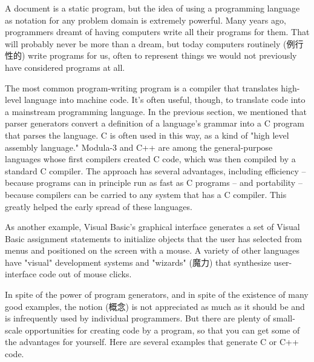 A document is a static program, but the idea of using a programming
language as notation for any problem domain is extremely powerful. Many
years ago, programmers dreamt of having computers write all their programs
for them. That will probably never be more than a dream, but today
computers routinely (例行性的) write programs for us, often to represent
things we would not previously have considered programs at all.

The most common program-writing program is a compiler that translates high-
level language into machine code. It's often useful, though, to translate
code into a mainstream programming language. In the previous section, we
mentioned that parser generators convert a definition of a language's
grammar into a C program that parses the language. C is often used in this
way, as a kind of "high level assembly language." Modula-3 and C++ are
among the general-purpose languages whose first compilers created C code,
which was then compiled by a standard C compiler.  The approach has several
advantages, including efficiency -- because programs can in principle run
as fast as C programs -- and portability -- because compilers can be
carried to any system that has a C compiler. This greatly helped the early
spread of these languages.

As another example, Visual Basic's graphical interface generates a set of
Visual Basic assignment statements to initialize objects that the user has
selected from menus and positioned on the screen with a mouse. A variety of
other languages have "visual" development systems and "wizards" (魔力) that
synthesize user-interface code out of mouse clicks.

In spite of the power of program generators, and in spite of the existence
of many good examples, the notion (概念) is not appreciated as much as it
should be and is infrequently used by individual programmers. But there are
plenty of small-scale opportunities for creating code by a program, so that
you can get some of the advantages for yourself. Here are several examples
that generate C or C++ code.

